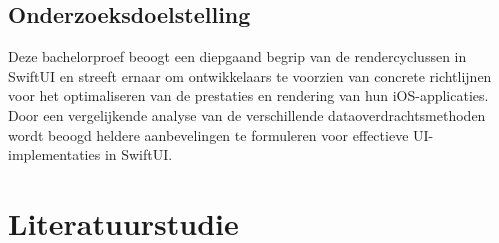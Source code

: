 \subsection{Onderzoeksdoelstelling}
Deze bachelorproef beoogt een diepgaand begrip van de rendercyclussen in SwiftUI en streeft ernaar om ontwikkelaars te voorzien van concrete richtlijnen voor het optimaliseren van de prestaties en rendering van hun iOS-applicaties. Door een vergelijkende analyse van de verschillende dataoverdrachtsmethoden wordt beoogd heldere aanbevelingen te formuleren voor effectieve UI-implementaties in SwiftUI.



\section{Literatuurstudie}%
\label{sec:state-of-the-art}

